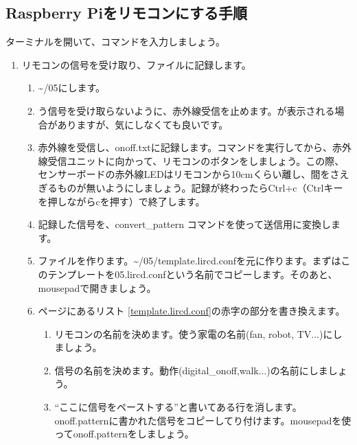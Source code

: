 \subsection{Raspberry Piをリモコンにする手順}
\noindent
ターミナルを開いて、コマンドを入力しましょう。
\begin{enumerate}
\item リモコンの信号を受け取り、ファイルに記録します。
 \begin{enumerate}[1]
  \item \textasciitilde /05にします。\\ 
  \item {}う信号を受け取らないように、赤外線受信を止めます。が表示される場合がありますが、気にしなくても良いです。 \\ 
  \item 赤外線を受信し、onoff.txtに記録します。コマンドを実行してから、赤外線受信ユニットに向かって、リモコンのボタンをしましょう。この際、センサーボードの赤外線LEDはリモコンから10cmくらい離し、間をさえぎるものが無いようにしましょう。記録が終わったらCtrl+c（Ctrlキーを押しながらcを押す）で終了します。\\ 
  \item 記録した信号を、convert\_pattern コマンドを使って送信用に変換します。\\ 
  \item {}ファイルを作ります。\textasciitilde /05/template.lircd.confを元に作ります。まずはこのテンプレートを05.lircd.confという名前でコピーします。そのあと、mousepadで開きましょう。\\ 
  \item \pageref{template.lircd.conf}ページにあるリスト \ref{template.lircd.conf}の赤字の部分を書き換えます。
  \begin{enumerate}[(1)]
    \item リモコンの名前を決めます。使う家電の名前(fan, robot, TV...)にしましょう。
    \item 信号の名前を決めます。動作(digital\_onoff,walk...)の名前にしましょう。
    \item “ここに信号をペーストする”と書いてある行を消します。onoff.patternに書かれた信号をコピーしてり付けます。mousepadを使ってonoff.patternをしましょう。\\ 

\end{enumerate}
\end{enumerate}
\end{enumerate}

